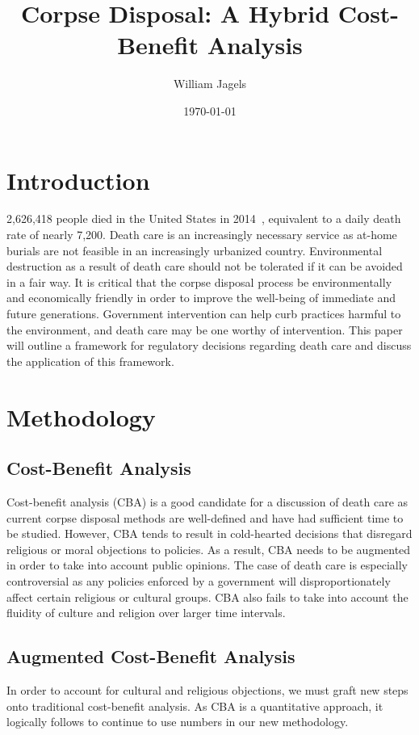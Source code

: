 \documentclass[a4paper,12pt]{article}
\begin{document}
\title{Corpse Disposal: A Hybrid Cost-Benefit Analysis}
\author{William Jagels}
\date{\today}
\begin{titlepage}
  \clearpage
  \maketitle
  \thispagestyle{empty}
\end{titlepage}

\section{Introduction}
2,626,418 people died in the United States in 2014~\cite{mortality}, equivalent to a daily death rate of nearly 7,200.
Death care is an increasingly necessary service as at-home burials are not feasible in an increasingly urbanized country.
Environmental destruction as a result of death care should not be tolerated if it can be avoided in a fair way.
It is critical that the corpse disposal process be environmentally and economically friendly in order to improve the well-being of immediate and future generations.
Government intervention can help curb practices harmful to the environment, and death care may be one worthy of intervention.
This paper will outline a framework for regulatory decisions regarding death care and discuss the application of this framework.

\section{Methodology}
\subsection{Cost-Benefit Analysis}
Cost-benefit analysis (CBA) is a good candidate for a discussion of death care as current corpse disposal methods are well-defined and have had sufficient time to be studied.
However, CBA tends to result in cold-hearted decisions that disregard religious or moral objections to policies.
As a result, CBA needs to be augmented in order to take into account public opinions.
The case of death care is especially controversial as any policies enforced by a government will disproportionately affect certain religious or cultural groups.
CBA also fails to take into account the fluidity of culture and religion over larger time intervals.
\subsection{Augmented Cost-Benefit Analysis}
In order to account for cultural and religious objections, we must graft new steps onto traditional cost-benefit analysis\@.
As CBA is a quantitative approach, it logically follows to continue to use numbers in our new methodology.
\end{document}
